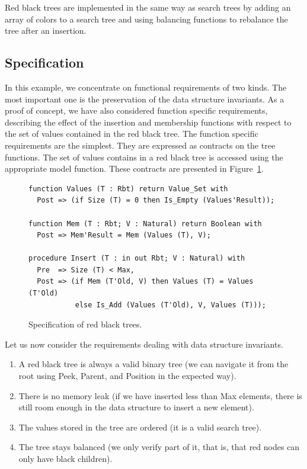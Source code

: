 \documentclass[11pt,a4paper]{article}
\begin{document}
Red black trees are implemented in the same way as search trees by adding an array of
colors to a search tree and using balancing functions to rebalance the tree after an insertion.

\subsection{Specification}

In this example, we concentrate on functional requirements of two kinds. The most important one is the
preservation of the data structure invariants. As a proof of concept, we have also considered
function specific requirements, describing the effect of the insertion and membership functions with
respect to the set of values contained in the red black tree. The function specific requirements are the
simplest. They are expressed as contracts on the tree functions. The set of values contains in a red black
tree is accessed using the appropriate model function. These contracts are presented in
Figure~\ref{fig-rbt-spec}.

\begin{figure}[ht]
\begin{small}
\begin{lstlisting}
function Values (T : Rbt) return Value_Set with
  Post => (if Size (T) = 0 then Is_Empty (Values'Result));

function Mem (T : Rbt; V : Natural) return Boolean with
  Post => Mem'Result = Mem (Values (T), V);

procedure Insert (T : in out Rbt; V : Natural) with
  Pre  => Size (T) < Max,
  Post => (if Mem (T'Old, V) then Values (T) = Values (T'Old)
           else Is_Add (Values (T'Old), V, Values (T)));
\end{lstlisting}
\end{small}
\caption{\label{fig-rbt-spec} Specification of red black trees.}
\end{figure}

Let us now consider the requirements dealing with data structure invariants.

\begin{enumerate}
 \item A red black tree is always a valid binary tree (we can navigate it from the root using Peek, Parent,
 and Position in the expected way).
 \item There is no memory leak (if we have inserted less than Max elements, there is still room enough in the
 data structure to insert a new element).
 \item The values stored in the tree are ordered (it is a valid search tree).
 \item The tree stays balanced (we only verify part of it, that is, that red nodes can only have black children).
\end{enumerate}
\end{document}
